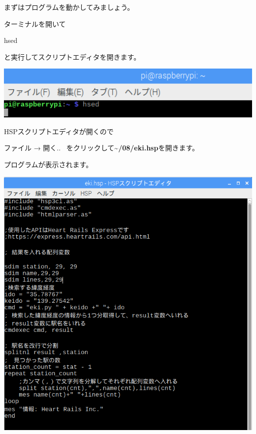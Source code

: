 \documentclass[a4paper,12pt,dvipdfmx]{jarticle}
\begin{document}
\bigskip


\bigskip

\clearpage
まずはプログラムを動かしてみましょう。

ターミナルを開いて

hsed

と実行してスクリプトエディタを開きます。



\begin{center}
\includegraphics[width=17.057cm]{textbook-img013.png}

\end{center}
HSPスクリプトエディタが開くので

ファイル → 開く..
\ をクリックして\textbf{{\textasciitilde}/08/eki.hsp}を開きます。

プログラムが表示されます。



\begin{center}
\includegraphics[width=13.377cm]{textbook-img050.png}

\end{center}
\end{document}
